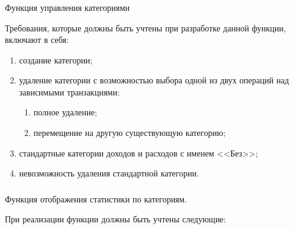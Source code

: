 \subsubsection{} Функция управления категориями
\label{sec:domain:specification:categories}

Требования, которые должны быть учтены при разработке данной функции, включают в себя:

\begin{enumerate}
    \item создание категории;
    \item удаление категории с возможностью выбора одной из двух операций над зависимыми транзакциями:
    \begin{enumerate}
        \item полное удаление;
        \item перемещение на другую существующую категорию;
    \end{enumerate}
    \item стандартные категории доходов и расходов с именем <<Без>>;
    \item невозможность удаления стандартной категории.
\end{enumerate}

\subsubsection{} Функция отображения статистики по категориям.
\label{sec:domain:specification:categories_stats}

При реализации функции должны быть учтены следующие:

